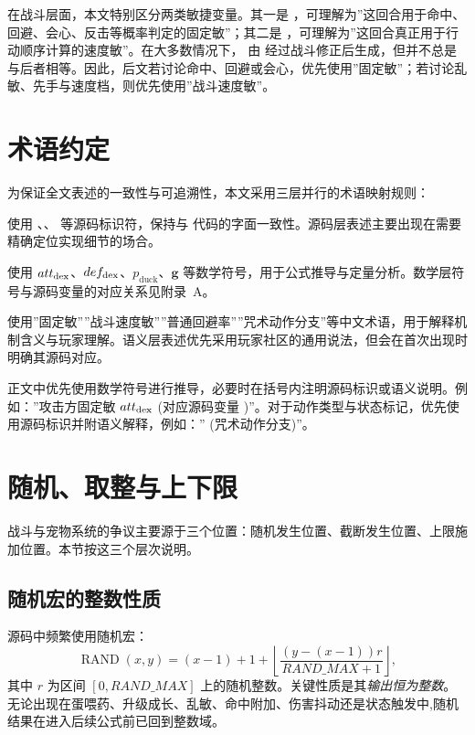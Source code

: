 在战斗层面，本文特别区分两类敏捷变量。其一是 \fixdex{}，可理解为”这回合用于命中、回避、会心、反击等概率判定的固定敏”；其二是 \quick{}，可理解为”这回合真正用于行动顺序计算的速度敏”。在大多数情况下，\quick{} 由 \fixdex{} 经过战斗修正后生成，但并不总是与后者相等。因此，后文若讨论命中、回避或会心，优先使用”固定敏”；若讨论乱敏、先手与速度档，则优先使用”战斗速度敏”。

\section{术语约定}

为保证全文表述的一致性与可追溯性，本文采用三层并行的术语映射规则：

\begin{description}[leftmargin=2.5cm,style=nextline]
\item[\textbf{源码层}] 使用 、、 等源码标识符，保持与  代码的字面一致性。源码层表述主要出现在需要精确定位实现细节的场合。

\item[\textbf{数学层}] 使用 $att_{\mathrm{dex}}$、$def_{\mathrm{dex}}$、$p_{\mathrm{duck}}$、$\bm{g}$ 等数学符号，用于公式推导与定量分析。数学层符号与源码变量的对应关系见附录~A。

\item[\textbf{语义层}] 使用”固定敏””战斗速度敏””普通回避率””咒术动作分支”等中文术语，用于解释机制含义与玩家理解。语义层表述优先采用玩家社区的通用说法，但会在首次出现时明确其源码对应。
\end{description}

正文中优先使用数学符号进行推导，必要时在括号内注明源码标识或语义说明。例如：”攻击方固定敏 $att_{\mathrm{dex}}$ (对应源码变量 \fixdex{})”。对于动作类型与状态标记，优先使用源码标识并附语义解释，例如：” (咒术动作分支)”。

\section{随机、取整与上下限}

战斗与宠物系统的争议主要源于三个位置：随机发生位置、截断发生位置、上限施加位置。本节按这三个层次说明。

\subsection{随机宏的整数性质}

源码中频繁使用随机宏：
\begin{equation}
    \operatorname{RAND}(x,y) = (x-1)+1+\left\lfloor \frac{(y-(x-1))r}{RAND\_MAX+1} \right\rfloor,
\end{equation}
其中 $r$ 为区间 $[0,RAND\_MAX]$ 上的随机整数。关键性质是其\emph{输出恒为整数}。无论出现在蛋喂药、升级成长、乱敏、命中附加、伤害抖动还是状态触发中,随机结果在进入后续公式前已回到整数域。

